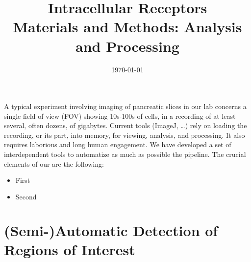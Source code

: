 \documentclass[a4paper,11pt,final]{article}
\title{Intracellular Receptors \\ {\small Materials and Methods: Analysis and Processing}}
\date{\today}
\begin{document}
\maketitle


A typical experiment involving imaging of pancreatic slices in our lab concerns a single field of view (FOV)
showing 10s-100s of cells, in a recording of at least several, often dozens, of gigabytes.
Current tools (ImageJ, \dots) rely on loading the recording, or its part, into memory, for viewing, analysis, and processing.
It also requires laborious and long human engagement.
We have developed a set of interdependent tools to automatize as much as possible the pipeline.
The crucial elements of our are the following:
\begin{itemize}
\item First
\item Second
\end{itemize}


\section{(Semi-)Automatic Detection of Regions of Interest}

\end{document}
